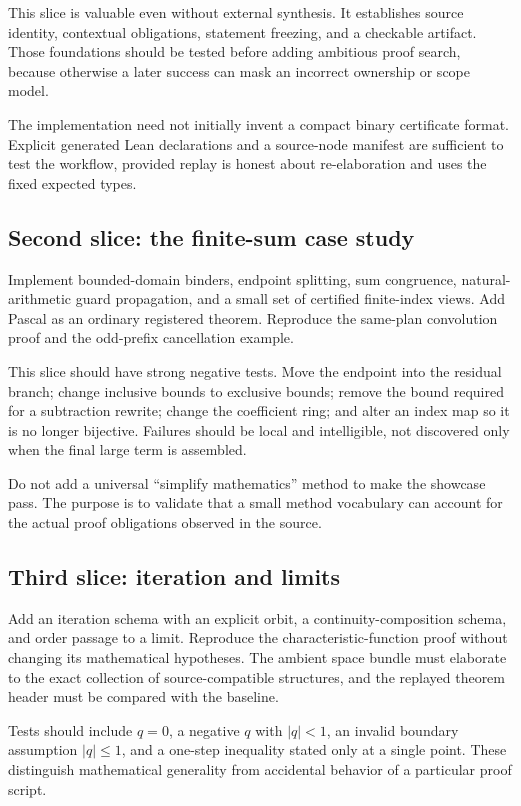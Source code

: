 \documentclass[11pt,letterpaper]{article}
\theoremstyle{definition}
\theoremstyle{remark}
\begin{document}
This slice is valuable even without external synthesis. It establishes source identity, contextual obligations, statement freezing, and a checkable artifact. Those foundations should be tested before adding ambitious proof search, because otherwise a later success can mask an incorrect ownership or scope model.

The implementation need not initially invent a compact binary certificate format. Explicit generated Lean declarations and a source-node manifest are sufficient to test the workflow, provided replay is honest about re-elaboration and uses the fixed expected types.

\subsection{Second slice: the finite-sum case study}
Implement bounded-domain binders, endpoint splitting, sum congruence, natural-arithmetic guard propagation, and a small set of certified finite-index views. Add Pascal as an ordinary registered theorem. Reproduce the same-plan convolution proof and the odd-prefix cancellation example.

This slice should have strong negative tests. Move the endpoint into the residual branch; change inclusive bounds to exclusive bounds; remove the bound required for a subtraction rewrite; change the coefficient ring; and alter an index map so it is no longer bijective. Failures should be local and intelligible, not discovered only when the final large term is assembled.

Do not add a universal ``simplify mathematics'' method to make the showcase pass. The purpose is to validate that a small method vocabulary can account for the actual proof obligations observed in the source.

\subsection{Third slice: iteration and limits}
Add an iteration schema with an explicit orbit, a continuity-composition schema, and order passage to a limit. Reproduce the characteristic-function proof without changing its mathematical hypotheses. The ambient space bundle must elaborate to the exact collection of source-compatible structures, and the replayed theorem header must be compared with the baseline.

Tests should include $q=0$, a negative $q$ with $|q|<1$, an invalid boundary assumption $|q|\le1$, and a one-step inequality stated only at a single point. These distinguish mathematical generality from accidental behavior of a particular proof script.
\end{document}
